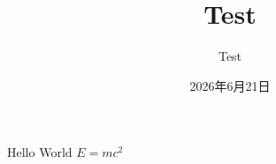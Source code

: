 \documentclass{harryopo-paper}
\title{Test}
\author{Test}
\date{2026年6月21日}
\begin{document}
\maketitle
Hello World $E=mc^2$
\end{document}
